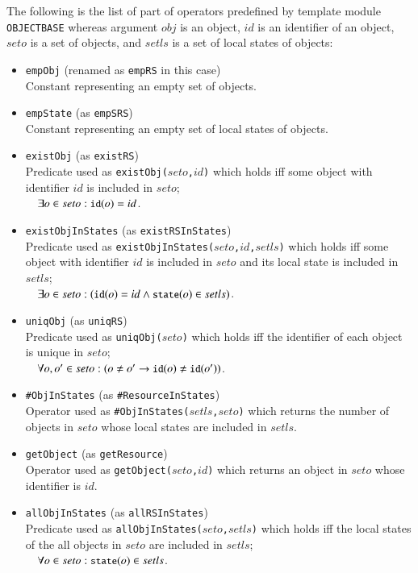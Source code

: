 \documentclass[12pt]{report}
\newcommand{\ra}{\rightarrow}
\newcommand{\mbstt}[1]{\mbox{\small{\tt {#1}}}}
\newcommand{\stt}[1]{{\small{\tt {#1}}}}
\begin{document}
The following is the list of part of operators predefined by
template module {\tt OBJECTBASE} whereas argument $\mathit{obj}$ is an object,
$id$ is an identifier of an object, $seto$ is a set of objects, and
$setls$ is a set of local states of objects:
\begin{itemize}
\item \stt{empObj} (renamed as \stt{empRS} in this case)\\
  Constant representing an empty set of objects.
\item \stt{empState} (as \stt{empSRS})\\
  Constant representing an empty set of local states of objects.
\item \stt{existObj} (as \stt{existRS})\\ 
  Predicate used as \stt{existObj($seto$,$id$)} which holds iff some
  object with identifier $id$ is included in $seto$;\\$~~~~\exists o\in
  seto: \mbstt{id}(o)=id$.
\item \stt{existObjInStates} (as \stt{existRSInStates})\\
  Predicate used as \stt{existObjInStates($seto$,$id$,$setls$)} which
  holds iff some object with identifier $id$ is included in $seto$ and
  its local state is included in $setls$;\\$~~~~\exists o\in seto:
  (\mbstt{id}(o)=id \land \mbstt{state}(o)\in setls)$.
\item \stt{uniqObj} (as \stt{uniqRS})\\
  Predicate used as \stt{uniqObj($seto$)} which holds iff the
  identifier of each object is unique in $seto$;\\$~~~~\forall o,o'\in
  seto:(o\ne o'\ra\mbstt{id}(o)\ne\mbstt{id}(o'))$.
\item \stt{\#ObjInStates} (as \stt{\#ResourceInStates})\\ 
  Operator used as \stt{\#ObjInStates($setls$,$seto$)} which returns
  the number of objects in $seto$ whose local states are
  included in $setls$.
\item \stt{getObject} (as \stt{getResource})\\ 
  Operator used as \stt{getObject($seto$,$id$)} which returns an
  object in $seto$ whose identifier is $id$.
\item \stt{allObjInStates} (as \stt{allRSInStates})\\
  Predicate used as \stt{allObjInStates($seto$,$setls$)} which holds iff
  the local states of the all objects in $seto$ are included
  in $setls$;\\$~~~~\forall o\in seto:\mbstt{state}(o)\in setls$.

\end{itemize}
\end{document}
